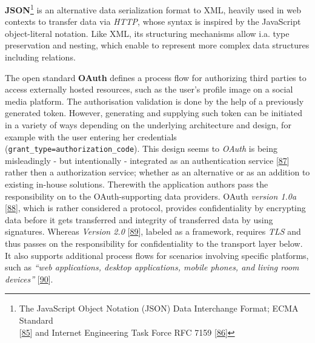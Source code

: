 \documentclass[12pt,english,a4paper,titlepage,cleardoublepage=empty,dottedtoc]{report}
\begin{document}
\textbf{JSON}\footnote{The JavaScript Object Notation (JSON) Data
  Interchange Format; ECMA Standard\\
  {[}\protect\hyperlink{ref-web_spec_json}{85}{]} and Internet
  Engineering Task Force RFC 7159
  {[}\protect\hyperlink{ref-web_rfc_json}{86}{]}} is an alternative data
serialization format to XML, heavily used in web contexts to transfer
data via \emph{HTTP}, whose syntax is inspired by the JavaScript
object-literal notation. Like XML, its structuring mechanisms allow i.a.
type preservation and nesting, which enable to represent more complex
data structures including relations.

The open standard \textbf{\protect\hypertarget{link_oauth}{}{OAuth}}
defines a process flow for authorizing third parties to access
externally hosted resources, such as the user's profile image on a
social media platform. The authorisation validation is done by the help
of a previously generated token. However, generating and supplying such
token can be initiated in a variety of ways depending on the underlying
architecture and design, for example with the user entering her
credentials (\texttt{grant\_type=authorization\_code}). This design
seems to \emph{OAuth} is being misleadingly - but intentionally -
integrated as an authentication service
{[}\protect\hyperlink{ref-web_2012_problem-with-oauth-for-authentication}{87}{]}
rather then a authorization service; whether as an alternative or as an
addition to existing in-house solutions. Therewith the application
authors pass the responsibility on to the OAuth-supporting data
providers. OAuth \emph{version 1.0a}
{[}\protect\hyperlink{ref-web_spec_oauth-1a}{88}{]}, which is rather
considered a protocol, provides confidentiality by encrypting data
before it gets transferred and integrity of transferred data by using
signatures. Whereas \emph{Version 2.0}
{[}\protect\hyperlink{ref-web_spec_oauth-2}{89}{]}, labeled as a
framework, requires \emph{TLS} and thus passes on the responsibility for
confidentiality to the transport layer below. It also supports
additional process flows for scenarios involving specific platforms,
such as \emph{``web applications, desktop applications, mobile phones,
and living room devices''}
{[}\protect\hyperlink{ref-web_2016_oauth-2}{90}{]}.
\end{document}

